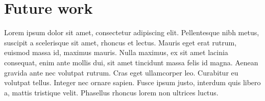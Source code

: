 
\section{Future work}\label{sec:futurework}
Lorem ipsum dolor sit amet, consectetur adipiscing elit. Pellentesque nibh metus, suscipit a scelerisque sit amet, rhoncus et lectus. Mauris eget erat rutrum, euismod massa id, maximus mauris. Nulla maximus, ex sit amet lacinia consequat, enim ante mollis dui, sit amet tincidunt massa felis id magna. Aenean gravida ante nec volutpat rutrum. Cras eget ullamcorper leo. Curabitur eu volutpat tellus. Integer nec ornare sapien. Fusce ipsum justo, interdum quis libero a, mattis tristique velit. Phasellus rhoncus lorem non ultrices luctus.

